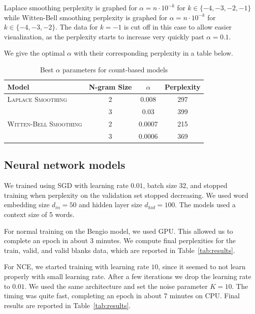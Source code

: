 \documentclass[11pt]{article}
\begin{document}
Laplace smoothing perplexity is graphed for $\alpha = n \cdot 10^{-k}$ for $k \in \{-4, -3, -2, -1\}$ while Witten-Bell smoothing perplexity is graphed for $\alpha = n \cdot 10^{-k}$ for $k \in \{-4, -3, -2\}$. The data for $k = -1$ is cut off in this case to allow easier visualization, as the perplexity starts to increase very quickly past $\alpha = 0.1$.  

We give the optimal $\alpha$ with their corresponding perplexity in a table below. 

\begin{table}[h]
  \centering
  \begin{tabular}{lccc}
    \toprule
    Model & N-gram Size & $\alpha$ & Perplexity \\
    \midrule
    \textsc{Laplace Smoothing} & 2 & 0.008 & 297 \\
    & 3 & 0.03 & 399 \\
    \textsc{Witten-Bell Smoothing} & 2 & 0.0007 & 215 \\
    & 3 & 0.0006 & 369 \\
    \bottomrule
  \end{tabular}
  \caption{\label{tab:alpha} Best $\alpha$ parameters for count-based models}
\end{table}

\subsection{Neural network models}

We trained using SGD with learning rate $0.01$, batch size 32, and stopped training when perplexity on the validation set stopped decreasing. We used word embedding size $d_{in} = 50$ and hidden layer size $d_{hid} = 100$. The models used a context size of 5 words.

For normal training on the Bengio model, we used GPU. This allowed us to complete an epoch in about 3 minutes. We compute final perplexities for the train, valid, and valid blanks data, which are reported in Table~\ref{tab:results}.

For NCE, we started training with learning rate $10$, since it seemed to not learn properly with small learning rate. After a few iterations we drop the learning rate to $0.01$. We used the same architecture and set the noise parameter $K = 10$. The timing was quite fast, completing an epoch in about 7 minutes on CPU. Final results are reported in Table~\ref{tab:results}.

\end{document}

